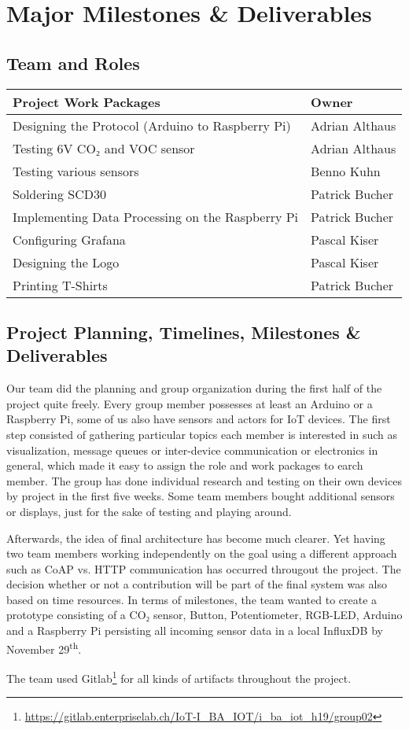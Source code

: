 \section{Major Milestones \& Deliverables}

\subsection{Team and Roles}

\begin{tabular}{p{9cm}p{4cm}}
\textbf{Project Work Packages} & \textbf{Owner} \\
\hline
Designing the Protocol (Arduino to Raspberry Pi) & Adrian Althaus \\
Testing 6V CO₂ and VOC sensor & Adrian Althaus \\
Testing various sensors & Benno Kuhn \\
Soldering SCD30 & Patrick Bucher \\
Implementing Data Processing on the Raspberry Pi & Patrick Bucher \\
Configuring Grafana & Pascal Kiser \\
Designing the Logo & Pascal Kiser \\
Printing T-Shirts & Patrick Bucher
\end{tabular}

\subsection{Project Planning, Timelines, Milestones \& Deliverables}
Our team did the planning and group organization during the first half of the project quite freely. Every group member possesses at least an Arduino or a Raspberry Pi, some of us also have sensors and actors for IoT devices. The first step consisted of gathering particular topics each member is interested in such as visualization, message queues or inter-device communication or electronics in general, which made it easy to assign the role and work packages to earch member. The group has done individual research and testing on their own devices by project in the first five weeks. Some team members bought additional sensors or displays, just for the sake of testing and playing around. 

Afterwards, the idea of final architecture has become much clearer. Yet having two team members working independently on the goal using a different approach such as CoAP vs. HTTP communication has occurred througout the project. The decision whether or not a contribution will be part of the final system was also based on time resources. In terms of milestones, the team wanted to create a prototype consisting of a CO₂ sensor, Button, Potentiometer, RGB-LED, Arduino and a Raspberry Pi persisting all incoming sensor data in a local InfluxDB by November 29\textsuperscript{th}. 

The team used Gitlab\footnote{\url{https://gitlab.enterpriselab.ch/IoT-I_BA_IOT/i_ba_iot_h19/group02}} for all kinds of artifacts throughout the project.
